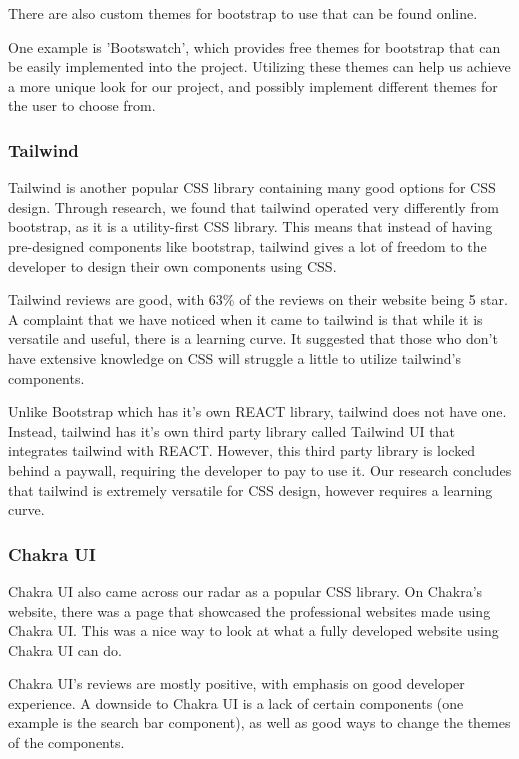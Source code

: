 \documentclass[12pt]{article}
\begin{document}
There are also custom themes for bootstrap to use that can be found online.

One example is 'Bootswatch', which provides free themes for bootstrap that can be easily implemented into the project.
Utilizing these themes can help us achieve a more unique look for our project, and possibly implement different themes for the user to choose from.

\subsubsection{Tailwind}
Tailwind is another popular CSS library containing many good options for CSS design.
Through research, we found that tailwind operated very differently from bootstrap, as it is a utility-first CSS library.
This means that instead of having pre-designed components like bootstrap, tailwind gives a lot of freedom to the developer to design their own components using CSS.

Tailwind reviews are good, with 63\% of the reviews on their website being 5 star.
A complaint that we have noticed when it came to tailwind is that while it is versatile and useful, there is a learning curve.
It suggested that those who don't have extensive knowledge on CSS will struggle a little to utilize tailwind's components.

Unlike Bootstrap which has it's own REACT library, tailwind does not have one.
Instead, tailwind has it's own third party library called Tailwind UI that integrates tailwind with REACT.
However, this third party library is locked behind a paywall, requiring the developer to pay to use it.
Our research concludes that tailwind is extremely versatile for CSS design, however requires a learning curve.

\subsubsection{Chakra UI}
Chakra UI also came across our radar as a popular CSS library.
On Chakra's website, there was a page that showcased the professional websites made using Chakra UI.
This was a nice way to look at what a fully developed website using Chakra UI can do.

Chakra UI's reviews are mostly positive, with emphasis on good developer experience.
A downside to Chakra UI is a lack of certain components (one example is the search bar component), as well
as good ways to change the themes of the components.
\end{document}
